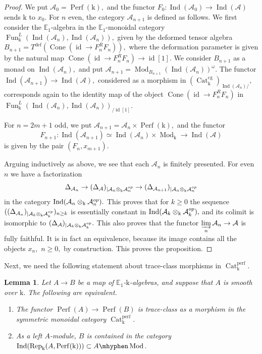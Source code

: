 \documentclass[11pt,leqno]{amsart}
\newtheorem{lemma}[theo]{Lemma}
\numberwithin{equation}{section}
\newcommand{\tens}[1]{%
  \mathbin{\mathop{\otimes}\displaylimits_{#1}}%
}
\newcommand{\hy}{\mhyphen}
\newcommand{\indlim}[1][]{\mathop{\varinjlim}\limits_{#1}}
\newcommand{\Cat}{\operatorname{Cat}}
\newcommand{\Cone}{\operatorname{Cone}}
\newcommand{\Fiber}{\operatorname{Fiber}}
\newcommand{\cg}{\operatorname{cg}}
\newcommand{\deff}{\operatorname{def}}
\newcommand{\bE}{{\mathbb E}}
\newcommand{\mk}{\mathrm k}
\newcommand{\cA}{{\mathcal A}}
\newcommand{\Fun}{\operatorname{Fun}}
\newcommand{\Perf}{\operatorname{Perf}}
\newcommand{\perf}{\operatorname{perf}}
\newcommand{\Rep}{\operatorname{Rep}}
\newcommand{\Ind}{\operatorname{Ind}}
\newcommand{\id}{\operatorname{id}}
\newcommand{\Mod}{\operatorname{Mod}}
\begin{document}
\begin{proof}
We put $\cA_0=\Perf(\mk),$ and the functor $F_0:\Ind(\cA_0)\to\Ind(\cA)$ sends $\mk$ to $x_0.$ For $n$ even, the category $\cA_{n+1}$ is defined as follows. We first consider the $\bE_1$-algebra in the $\bE_1$-monoidal category $\Fun_{\mk}^L(\Ind(\cA_n),\Ind(\cA_n)),$ given by the deformed tensor algebra $B_{n+1}=T^{\deff}(\Cone(\id\to F_n^R F_n)),$ where the deformation parameter is given by the natural map $\Cone(\id\to F_n^R F_n)\to \id[1].$ We consider $B_{n+1}$ as a monad on $\Ind(\cA_n),$ and put $\cA_{n+1}=\Mod_{B_{n+1}}(\Ind(\cA_n))^{\omega}.$ The functor $\Ind(\cA_{n+1})\to \Ind(\cA),$ considered as a morphism in $(\Cat_{\mk}^{\cg})_{\Ind(\cA_n)/},$ corresponds again to the identity map of the object $\Cone(\id\to F_n^R F_n)$ in $\Fun_{\mk}^L(\Ind(\cA_n),\Ind(\cA_n))_{/\id[1]}.$

For $n=2m+1$ odd, we put $\cA_{n+1}=\cA_n\times\Perf(\mk),$ and the functor 
\begin{equation*}
F_{n+1}:\Ind(\cA_{n+1})\simeq\Ind(\cA_n)\times \Mod_{\mk}\to\Ind(\cA)
\end{equation*} is given by the pair $(F_n,x_{m+1}).$

Arguing inductively as above, we see that each $\cA_n$ is finitely presented. For even $n$ we have a factorization
\begin{equation*}
\Delta_{\cA_n}\to (\Delta_{\cA})_{\mid \cA_n\tens{\mk}\cA_n^{op}}\to (\Delta_{\cA_{n+1}})_{\mid \cA_n\tens{\mk}\cA_n^{op}}
\end{equation*}
in the category $\Ind(\cA_n\tens{\mk}\cA_n^{op}).$ This proves that for $k\geq 0$ the sequence $((\Delta_{\cA_n})_{\mid\cA_k\tens{\mk}\cA_k^{op}})_{n\geq k}$ is essentially constant in $\Ind(\cA_k\tens{\mk}\cA_k^{op}),$ and its colimit is isomorphic to $(\Delta_{\cA})_{\mid \cA_k\tens{\mk}\cA_k^{op}}.$ This also proves that the functor $\indlim[n]\cA_n\to \cA$ is fully faithful. It is in fact an equivalence, because its image contains all the objects $x_n,$ $n\geq 0,$ by construction. This proves the proposition. 
\end{proof}

Next, we need the following statement about trace-class morphisms in $\Cat_{\mk}^{\perf}.$

\begin{lemma}\label{lem:trace_class_functors_from_smooth}
Let $A\to B$ be a map of $\bE_1$-$\mk$-algebras, and suppose that $A$ is smooth over $\mk.$ The following are equivalent.
\begin{enumerate}[label=(\roman*),ref=(\roman*)]
\item The functor $\Perf(A)\to\Perf(B)$ is trace-class as a morphism in the symmetric monoidal category $\Cat_{\mk}^{\perf}.$ \label{trace_class_in_Cat^perf}
\item As a left $A$-module, $B$ is contained in the category $\Ind(\Rep_{\mk}(A,\Perf(\mk)))\subset A\hy\Mod.$ \label{B_ind_finite_dimensional}
\end{enumerate}
\end{lemma}
\end{document}
